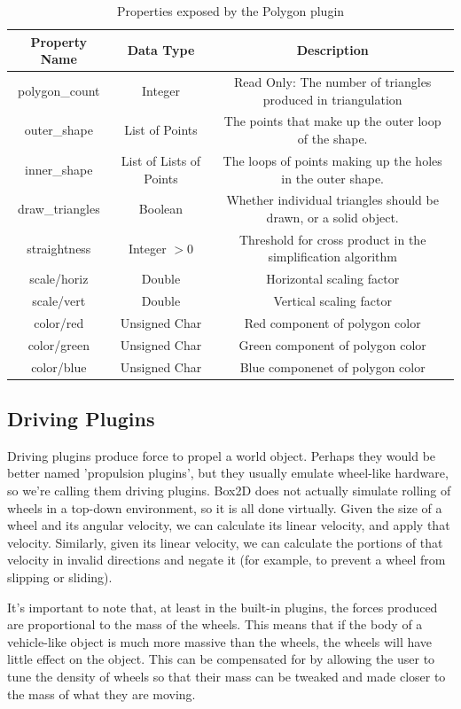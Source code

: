 \begin{itemize}
\begin{table}[h!]
	\centering
	\caption{Properties exposed by the Polygon plugin}
	\label{tab:polygon_props}
	\begin{tabular}{c|c|c}
	Property Name & Data Type & Description\\ \hline \hline
	polygon\_count & Integer & Read Only: The number of triangles produced in triangulation\\ \hline
	outer\_shape & List of Points & The points that make up the outer loop of the shape.\\ \hline
	inner\_shape & List of Lists of Points & The loops of points making up the holes in the outer shape.\\ \hline
	draw\_triangles & Boolean & Whether individual triangles should be drawn, or a solid object.\\ \hline
	straightness & Integer $ > 0 $ & Threshold for cross product in the simplification algorithm\\ \hline
	scale/horiz & Double & Horizontal scaling factor\\ \hline
	scale/vert & Double & Vertical scaling factor\\ \hline
	color/red & Unsigned Char & Red component of polygon color\\ \hline
	color/green & Unsigned Char & Green component of polygon color\\ \hline
	color/blue & Unsigned Char & Blue componenet of polygon color
	\end{tabular}
\end{table}

\subsection{Driving Plugins}
Driving plugins produce force to propel a world object. Perhaps they would be better named 'propulsion plugins', but they usually emulate wheel-like hardware, so we're calling them driving plugins. Box2D does not actually simulate rolling of wheels in a top-down environment, so it is all done virtually. Given the size of a wheel and its angular velocity, we can calculate its linear velocity, and apply that velocity. Similarly, given its linear velocity, we can calculate the portions of that velocity in invalid directions and negate it (for example, to prevent a wheel from slipping or sliding).

It's important to note that, at least in the built-in plugins, the forces produced are proportional to the mass of the wheels. This means that if the body of a vehicle-like object is much more massive than the wheels, the wheels will have little effect on the object. This can be compensated
for by allowing the user to tune the density of wheels so that their mass
can be tweaked and made closer to the mass of what they are moving.


\end{itemize}
